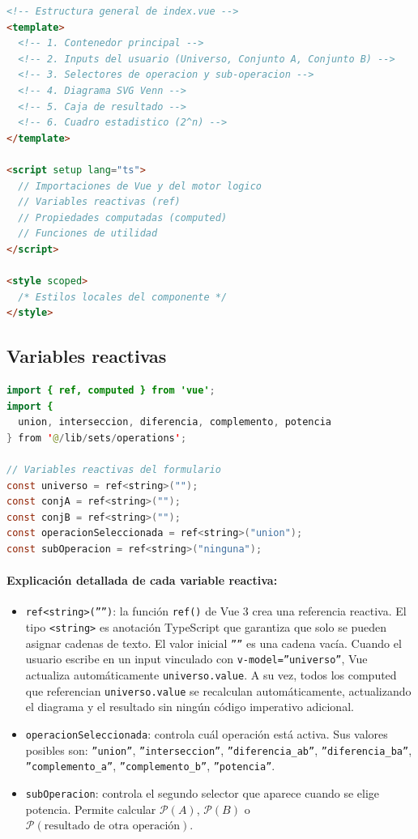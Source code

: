 \documentclass[11pt,a4paper]{article}
\begin{document}
\begin{lstlisting}[language=HTML, caption={Estructura general de index.vue}]
<!-- Estructura general de index.vue -->
<template>
  <!-- 1. Contenedor principal -->
  <!-- 2. Inputs del usuario (Universo, Conjunto A, Conjunto B) -->
  <!-- 3. Selectores de operacion y sub-operacion -->
  <!-- 4. Diagrama SVG Venn -->
  <!-- 5. Caja de resultado -->
  <!-- 6. Cuadro estadistico (2^n) -->
</template>

<script setup lang="ts">
  // Importaciones de Vue y del motor logico
  // Variables reactivas (ref)
  // Propiedades computadas (computed)
  // Funciones de utilidad
</script>

<style scoped>
  /* Estilos locales del componente */
</style>
\end{lstlisting}

\subsection{Variables reactivas}
\begin{lstlisting}[language=Java, caption={index.vue - importaciones y variables reactivas}]
import { ref, computed } from 'vue';
import {
  union, interseccion, diferencia, complemento, potencia
} from '@/lib/sets/operations';

// Variables reactivas del formulario
const universo = ref<string>("");
const conjA = ref<string>("");
const conjB = ref<string>("");
const operacionSeleccionada = ref<string>("union");
const subOperacion = ref<string>("ninguna");
\end{lstlisting}

\paragraph{Explicación detallada de cada variable reactiva:}
\begin{itemize}
    \item \texttt{ref<string>('''')}: la función \texttt{ref()} de Vue 3 crea una referencia reactiva. El tipo \texttt{<string>} es anotación TypeScript que garantiza que solo se pueden asignar cadenas de texto. El valor inicial \texttt{''''} es una cadena vacía. Cuando el usuario escribe en un input vinculado con \texttt{v-model=''universo''}, Vue actualiza automáticamente \texttt{universo.value}. A su vez, todos los computed que referencian \texttt{universo.value} se recalculan automáticamente, actualizando el diagrama y el resultado sin ningún código imperativo adicional.
    \item \texttt{operacionSeleccionada}: controla cuál operación está activa. Sus valores posibles son: \texttt{''union''}, \texttt{''interseccion''}, \texttt{''diferencia\_ab''}, \texttt{''diferencia\_ba''}, \texttt{''complemento\_a''}, \texttt{''complemento\_b''}, \texttt{''potencia''}.
    \item \texttt{subOperacion}: controla el segundo selector que aparece cuando se elige potencia. Permite calcular $\mathcal{P}(A)$, $\mathcal{P}(B)$ o $\mathcal{P}(\text{resultado de otra operación})$.
\end{itemize}
\end{document}
